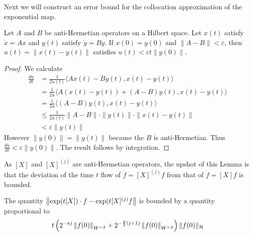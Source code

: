 Next we will construct an error bound for the collocation approximation of the exponential map.

\begin{lemma}
Let $A$ and $B$ be anti-Hermetian operators on a Hilbert space.  Let $x(t)$ satisfy $\dot{x} = Ax$ and $y(t)$ satisfy $\dot{y} = By$.  If $x(0) = y(0)$ and $\| A - B \| < \varepsilon$, then $u(t) = \| x(t) - y(t) \|$ satisfies $u(t) < \varepsilon t  \| y(0) \|$.
\end{lemma}

\begin{proof}
	We calculate
	\begin{align*}
		\frac{du}{dt} &= \frac{1}{2u(t)} \langle Ax(t) - By(t) , x(t) - y(t) \rangle \\
			&= \frac{1}{2u} \langle A(x(t)-y(t)) + (A-B) y(t) , x(t) - y(t) \rangle \\
			&= \frac{1}{2u} \langle (A-B)y(t) , x(t) - y(t) \rangle \\
			&\leq \frac{1}{2u(t)} \| A - B \| \cdot \| y(t) \| \cdot \| x(t) - y(t) \| \\
			&< \varepsilon \| y(t) \|
	\end{align*}
	However $\| y(0) \| = \| y(t)\|$ because the $B$ is anti-Hermetian.  Thus $\frac{du}{dt} < \varepsilon \| y(0)\|$.	The result follows by integration.
\end{proof}
As $[X]$ and $[X]^{(j)}$ are anti-Hermetian operators, the upshot of this Lemma is that the deviation of the time $t$ flow of $\dot{f} = [X]^{(j)} f$ from that of $\dot{f} = [X] f$ is bounded.

\begin{theorem}
The quantity $\left\|  \exp(t [X]) \cdot f - \exp(t [X]^{(j)} f  \right\|$ is bounded by a quantity proportional to 
\[
 	t \left( 2^{-sj}\left\| f(0) \right\|_{W^{s,2}} + 2^{-\frac{d}{2}(j+1)}\left\| f(0) \right\|_{W^{s,2}} \right) \| f (0) \|_{\mathcal{H}}
\]
\end{theorem}
